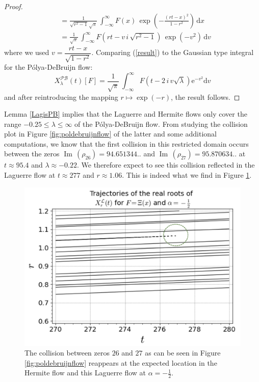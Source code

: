 \documentclass[a4paper,11pt,twoside]{amsart}
\renewcommand\Im{{\operatorname{Im\,}}}
\begin{document}
\begin{proof}
\begin{align}
&= \frac{1}{\sqrt{r^2-1}\,\sqrt{\pi}}\, \int_{-\infty}^\infty F(x)\,\exp\left(-\frac{(r t -x)^2}{1-r^2}\right)\,\mathrm{d} x \\
&= \frac{1}{\sqrt{\pi}}\, \int_{-\infty}^\infty F\left(r t-v \,i\, \sqrt{r^2-1}\right)\,\exp\left(-v^2\right)\,\mathrm{d} v \label{result}
\end{align}
where we used $v = \dfrac{r t -x}{\sqrt{1-r^2}}$. Comparing (\ref{result}) to the Gaussian type integral for the Pólya-DeBruijn flow:
\begin{equation}
X^{\mathcal{PB}}_{\lambda}(t)[F] =   \frac{1}{\sqrt{\pi}}\,\int_{-\infty}^\infty F\left(t - 2\,i\,v\sqrt{\lambda}\right)\mathrm{e}^{-v^2}\mathrm{d}v
\end{equation}
and after reintroducing the mapping $r \mapsto \exp(-r)$, the result follows.
\end{proof}

Lemma \ref{LagisPB} implies that the Laguerre and Hermite flows only cover the range $-0.25 \le \lambda \le \infty$ of the Pólya-DeBruijn flow. From studying the collision plot in Figure \ref{fig:poldebruijnflow} of the latter and some additional computations, we know that the first collision in this restricted domain occurs between the zeros $\Im(\rho_{26}) = 94.651344..$ and $\Im(\rho_{27}) = 95.870634..$ at $t \approx 95.4$ and $\lambda \approx -0.22$. We therefore expect to see this collision reflected in the Laguerre flow at $t \approx 277$ and $r \approx 1.06$. This is indeed what we find in Figure \ref{fig:flowLcoll}.
\begin{figure}[H]
  \includegraphics[width=0.7\linewidth]{LaguerreFlowColl.jpg}
  \caption{The collision between zeros $26$ and $27$ as can be seen in Figure \ref{fig:poldebruijnflow} reappears at the expected location in the Hermite flow and this Laguerre flow at $\alpha = -\frac12$.}
  \label{fig:flowLcoll}
\end{figure}
\end{document}
